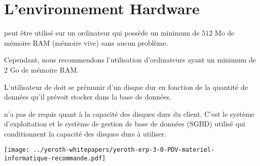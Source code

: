 \chapter{L'environnement Hardware}\label{chap:environement-materiel-requis}



\yeren peut \^etre utilis\'e sur un ordinateur qui
poss\`ede un minimum de $512$ Mo de m\'emoire RAM
(m\'emoire vive) sans aucun probl\`eme.

Cependant, nous recommendons l'utilisation d'ordinateurs
ayant un minimum de $2$ Go de m\'emoire RAM.



L'utilisateur de \yeren doit se pr\'emunir d'un disque
dur en fonction de la quantit\'e de donn\'ees qu'il
pr\'evoit stocker dans la base de donn\'ees.

\yeren n'a pas de requis quant \`a la capacit\'e
des disques durs du client. C'est le syst\`eme d'exploitation
et le syst\`eme de gestion de base de donn\'ees (SGBD)
utilis\'e qui conditionnent la capacit\'e des disques
durs \`a utiliser.


\newpage


\texttt{[image: ../yeroth-whitepapers/yeroth-erp-3-0-PDV-materiel-informatique-recommande.pdf]}
